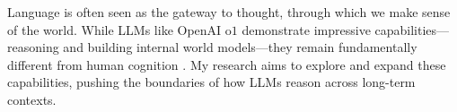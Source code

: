 Language is often seen as the gateway to thought, through which we make sense of the world.
% 
While LLMs like OpenAI o$1$ demonstrate impressive capabilities---reasoning and building internal world models---they remain fundamentally different from human cognition \citep{hessel_androids_2023,jones_comparing_2024}.
%
My research aims to explore and expand these capabilities, pushing the boundaries of how LLMs reason across long-term contexts.
